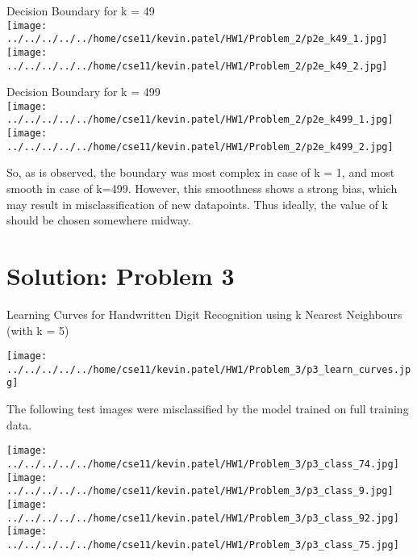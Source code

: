 \documentclass[twoside,10pt,a4paper]{article}
\theoremstyle{definition}
\theoremstyle{definition}
\theoremstyle{remark}
\renewcommand{\>}{{\rightarrow}}
\newcommand{\1}{{\mathbf 1}}
\newcommand{\0}{{\mathbf 0}}
\begin{document}
\begin{center}
Decision Boundary for k = 49 \\
 \texttt{[image: ../../../../../home/cse11/kevin.patel/HW1/Problem\_2/p2e\_k49\_1.jpg]}
\texttt{[image: ../../../../../home/cse11/kevin.patel/HW1/Problem\_2/p2e\_k49\_2.jpg]}
\end{center}

\begin{center}
Decision Boundary for k = 499 \\
 \texttt{[image: ../../../../../home/cse11/kevin.patel/HW1/Problem\_2/p2e\_k499\_1.jpg]}
\texttt{[image: ../../../../../home/cse11/kevin.patel/HW1/Problem\_2/p2e\_k499\_2.jpg]}
\end{center}
So, as is observed, the boundary was most complex in case of k = 1, and most smooth in case of k=499. However, this smoothness shows a strong bias, which may result in misclassification of new datapoints. Thus ideally, the value of k should be chosen somewhere midway.\\
\pagebreak
\section{Solution: Problem 3}
Learning Curves for Handwritten Digit Recognition using k Nearest Neighbours (with k = 5)
\begin{center}
 \texttt{[image: ../../../../../home/cse11/kevin.patel/HW1/Problem\_3/p3\_learn\_curves.jpg]}
\end{center}
The following test images were misclassified by the model trained on full training data.
\begin{center}
\texttt{[image: ../../../../../home/cse11/kevin.patel/HW1/Problem\_3/p3\_class\_74.jpg]}
 \texttt{[image: ../../../../../home/cse11/kevin.patel/HW1/Problem\_3/p3\_class\_9.jpg]}
\texttt{[image: ../../../../../home/cse11/kevin.patel/HW1/Problem\_3/p3\_class\_92.jpg]}
\texttt{[image: ../../../../../home/cse11/kevin.patel/HW1/Problem\_3/p3\_class\_75.jpg]}
\end{center}
\pagebreak
\end{document}
